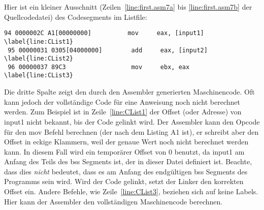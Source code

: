 {Hier ist ein kleiner Ausschnitt (Zeilen~\ref{line:first.asm7a} bis
\ref{line:first.asm7b} der Quellcodedatei) des Codesegments im
Listfile:
\begin{Verbatim}[xleftmargin=\AsmMargin, firstnumber=94, commandchars=\\\{\}]
 94 0000002C A1[00000000]          mov     eax, [input1] \label{line:CList1}
 95 00000031 0305[04000000]        add     eax, [input2] \label{line:CList2}
 96 00000037 89C3                  mov     ebx, eax      \label{line:CList3}
\end{Verbatim}
Die dritte Spalte zeigt den durch den Assembler generierten
Maschinencode. Oft kann jedoch der vollst\"{a}ndige Code f\"{u}r eine
Anweisung noch nicht berechnet werden. Zum Beispiel ist in
Zeile~\ref{line:CList1} der Offset (oder Adresse) von {\code input1}
nicht bekannt, bis der Code gelinkt wird. Der Assembler kann den
Opcode f\"{u}r den {\code mov} Befehl berechnen (der nach dem Listing A1
ist), er schreibt aber den Offset in eckige Klammern, weil der
genaue Wert noch nicht berechnet werden kann. In diesem Fall wird
ein tempor\"{a}rer Offset von 0 benutzt, da {\code input1} am Anfang des
Teils des bss Segments ist, der in dieser Datei definiert ist.
Beachte, dass dies \emph{nicht} bedeutet, dass es am Anfang des
endg\"{u}ltigen bss Segments des Programms sein wird. Wird der Code
gelinkt, setzt der Linker den korrekten Offset ein. Andere Befehle,
wie Zeile~\ref{line:CList3}, beziehen sich auf keine Labels. Hier
kann der Assembler den vollst\"{a}ndigen Maschinencode berechnen.

}

